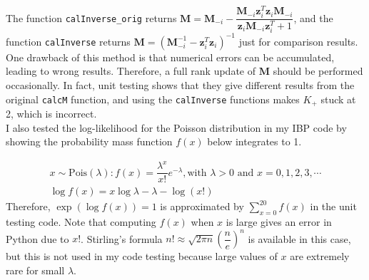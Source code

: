 The function \texttt{calInverse\_orig} returns $\mathbf{M} = \mathbf{M}_{-i} - \dfrac{\mathbf{M}_{-i}\mathbf{z}^T_i \mathbf{z}_i\mathbf{M}_{-i}}{\mathbf{z}_i\mathbf{M}_{-i}\mathbf{z}^T_i + 1}$, and the function \texttt{calInverse} returns $\mathbf{M} = (\mathbf{M}_{-i}^{-1} - \mathbf{z}^T_i \mathbf{z}_i)^{-1} $ just for comparison results. One drawback of this method is that numerical errors can be accumulated, leading to wrong results. Therefore, a full rank update of $\mathbf{M}$ should be performed occasionally. In fact, unit testing shows that they give different results from the original \texttt{calcM} function, and using the \texttt{calInverse} functions makes $K_+$ stuck at 2, which is incorrect.\\

I also tested the log-likelihood for the Poisson distribution in my IBP code by showing the probability mass function $f(x)$ below integrates to 1.

\begin{gather}
x \sim \text{Pois}(\lambda): f(x) = \dfrac{\lambda^x}{x!} e^{-\lambda}, \text{with } \lambda > 0 \text{ and } x = 0,1,2,3,\cdots \\
\log f(x) = x \log \lambda - \lambda - \log(x!)
\end{gather}
Therefore, $\exp(\log f(x)) = 1$ is approximated by $\sum^{20}_{x=0}f(x)$ in the unit testing code. Note that computing $f(x)$ when $x$ is large gives an error in Python due to $x!$. Stirling's formula $n! \approx \sqrt{2\pi n} (\dfrac{n}{e})^n$ is available in this case, but this is not used in my code testing because large values of $x$ are extremely rare for small $\lambda$.
